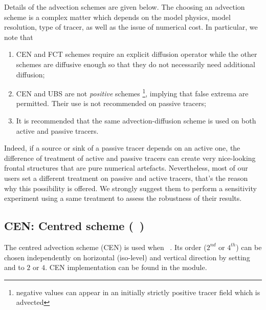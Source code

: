 \documentclass[../main/NEMO_manual]{subfiles}
\begin{document}
Details of the advection schemes are given below.
The choosing an advection scheme is a complex matter which depends on the model physics, model resolution,
type of tracer, as well as the issue of numerical cost. In particular, we note that

\begin{enumerate}
\item
  CEN and FCT schemes require an explicit diffusion operator while the other schemes are diffusive enough so that
  they do not necessarily need additional diffusion;
\item
  CEN and UBS are not \textit{positive} schemes
  \footnote{negative values can appear in an initially strictly positive tracer field which is advected},
  implying that false extrema are permitted.
  Their use is not recommended on passive tracers;
\item
  It is recommended that the same advection-diffusion scheme is used on both active and passive tracers.
\end{enumerate}

Indeed, if a source or sink of a passive tracer depends on an active one, the difference of treatment of active and
passive tracers can create very nice-looking frontal structures that are pure numerical artefacts.
Nevertheless, most of our users set a different treatment on passive and active tracers,
that's the reason why this possibility is offered.
We strongly suggest them to perform a sensitivity experiment using a same treatment to assess the robustness of
their results.

\subsection{CEN: Centred scheme (\protect{}~)}
\label{subsec:TRA_adv_cen}


The centred advection scheme (CEN) is used when ~.
Its order ($2^{nd}$ or $4^{th}$) can be chosen independently on horizontal (iso-level) and vertical direction by
setting  and  to $2$ or $4$.
CEN implementation can be found in the  module.
\end{document}

